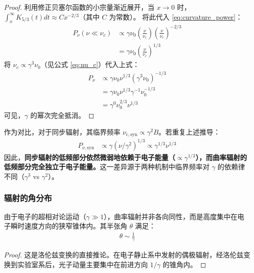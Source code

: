 \begin{proof}
利用修正贝塞尔函数的小宗量渐近展开，当 $x \to 0$ 时，$\int_x^{\infty} K_{5/3}(t) dt \approx C x^{-2/3}$（其中 $C$ 为常数）。
将此代入 \eqref{eq:curvature_power}：
\begin{align}
P_{\nu} (\nu \ll \nu_c) &\propto \gamma \nu_0 \left( \frac{\nu}{\nu_c} \right) \left( \frac{\nu}{\nu_c} \right)^{-2/3} \nonumber \\
&= \gamma \nu_0 \left( \frac{\nu}{\nu_c} \right)^{1/3} \label{eq:low_freq_step1}
\end{align}
将 $\nu_c \propto \gamma^3 \nu_0$（见公式 \eqref{eq:nu_c}）代入上式：
\begin{align}
P_{\nu} &\propto \gamma \nu_0 \nu^{1/3} (\gamma^3 \nu_0)^{-1/3} \nonumber \\
&= \gamma \nu_0 \nu^{1/3} \gamma^{-1} \nu_0^{-1/3} \nonumber \\
&= \gamma^{0} \nu_0^{2/3} \nu^{1/3} \label{eq:gamma_independence}
\end{align}
可见，$\gamma$ 的幂次完全抵消。
\end{proof}

\begin{derivationnote}[与同步辐射的对比]
作为对比，对于同步辐射，其临界频率 $\nu_{c, \mathrm{syn}} \propto \gamma^2 B$。若重复上述推导：
\begin{align}
P_{\nu, \mathrm{syn}} &\propto \gamma (\nu / \gamma^2)^{1/3} \propto \gamma^{1/3} \nu^{1/3}
\end{align}
因此，\textbf{同步辐射的低频部分依然微弱地依赖于电子能量（$\propto \gamma^{1/3}$），而曲率辐射的低频部分完全独立于电子能量。}这一差异源于两种机制中临界频率对 $\gamma$ 的依赖律不同（$\gamma^3$ vs $\gamma^2$）。
\end{derivationnote}

\subsubsection{辐射的角分布}

\begin{theorem}[相对论聚束效应]
由于电子的超相对论运动（$\gamma \gg 1$），曲率辐射并非各向同性，而是高度集中在电子瞬时速度方向的狭窄锥体内。其半张角 $\theta$ 满足：
\begin{align}
\theta \sim \frac{1}{\gamma} \label{eq:beaming}
\end{align}
\end{theorem}

\begin{proof}
这是洛伦兹变换的直接推论。在电子静止系中发射的偶极辐射，经洛伦兹变换到实验室系后，光子动量主要集中在前进方向 $1/\gamma$ 的锥角内。
\end{proof}